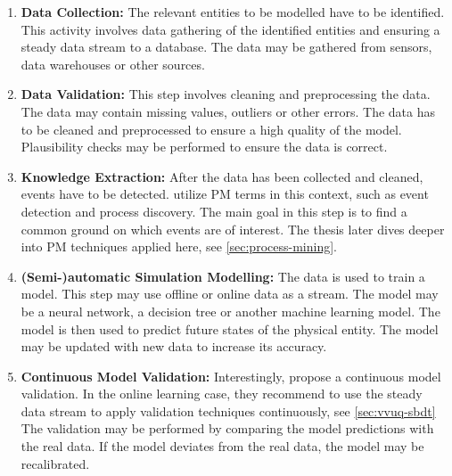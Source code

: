 \begin{enumerate}
  \item \textbf{Data Collection:} The relevant entities to be modelled have to be identified. This activity involves data gathering of the identified entities and ensuring a steady data stream to a database. The data may be gathered from sensors, data warehouses or other sources.
  \item \textbf{Data Validation:} This step involves cleaning and preprocessing the data. The data may contain missing values, outliers or other errors. The data has to be cleaned and preprocessed to ensure a high quality of the model. Plausibility checks may be performed to ensure the data is correct.
  \item \textbf{Knowledge Extraction:} After the data has been collected and cleaned, events have to be detected.  utilize PM terms in this context, such as event detection and process discovery. The main goal in this step is to find a common ground on which events are of interest. The thesis later dives deeper into PM techniques applied here, see \autoref{sec:process-mining}.
  \item \textbf{(Semi-)automatic Simulation Modelling:} The data is used to train a model. This step may use offline or online data as a stream. The model may be a neural network, a decision tree or another machine learning model. The model is then used to predict future states of the physical entity. The model may be updated with new data to increase its accuracy.
  \item \textbf{Continuous Model Validation:} Interestingly,\citeauthor{francis2021towards} propose a continuous model validation. In the online learning case, they recommend to use the steady data stream to apply validation techniques continuously, see \autoref{sec:vvuq-sbdt} The validation may be performed by comparing the model predictions with the real data. If the model deviates from the real data, the model may be recalibrated.
\end{enumerate}


